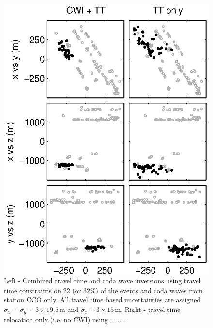 \documentclass[draft,jgrga]{agutex}
\begin{document}
\begin{figure}
\noindent\includegraphics{diags/CalaverasLoc6.eps}
\caption{Left - Combined travel time and coda wave inversions using travel time constraints on
22 (or 32\%) of the events and coda waves from station CCO only. All travel time based uncertainties
are assigned $\sigma_x = \sigma_y = 3 \times19.5$\,m and $\sigma_z = 3\times15$\,m. Right - travel time
relocation only (i.e. no CWI) using ........}
\label{fig-68Calaverasevents_ttsubsetandcoda1}
\end{figure}
\end{document}
